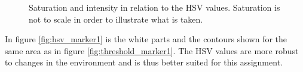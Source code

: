 \begin{figure}
\centering
 \caption[Saturation and intensity in relation to the HSV values.]{Saturation and intensity in relation to the HSV values. Saturation is not to scale in order to illustrate what is taken.}
 \label{fig:hsv_intensity}
\end{figure}


In figure \ref{fig:hsv_marker1} is the white parts and the contours shown for the same area as in figure \ref{fig:threshold_marker1}.
The HSV values are more robust to changes in the environment and is thus better suited for this assignment.

